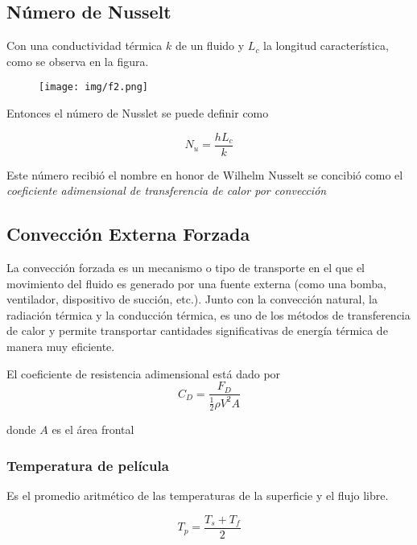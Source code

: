 \subsection{Número de Nusselt}
Con una conductividad térmica $k$ de un fluido
y $L_c$ la longitud característica, como se 
observa en la figura.

\begin{figure}[ht]
    \begin{center}
        \texttt{[image: img/f2.png]}
    \end{center}
     
\end{figure}

Entonces el número de Nusslet se puede definir como

\begin{equation}
    \label{eq:nu:nusselt}
    N_u = \frac{h L_c}{k}
\end{equation}

Este número recibió el nombre en honor de Wilhelm Nusselt
se concibió como el \textit{coeficiente adimensional de
transferencia de calor por convección}




\subsection{Convección Externa Forzada}

La convección forzada es un mecanismo o tipo de transporte en el que el movimiento del fluido es generado por una fuente externa (como una bomba, ventilador, dispositivo de succión, etc.). Junto con la convección natural, la radiación térmica y la conducción térmica, es uno de los métodos de transferencia de calor y permite transportar cantidades significativas de energía térmica de manera muy eficiente.

El coeficiente de resistencia adimensional está dado por
\begin{equation}
    C_D = \frac{F_D}{\frac{1}{2} \rho V^2 A}
\end{equation}

donde $A$ es el área frontal

\subsubsection{Temperatura de película}
Es el promedio aritmético de las temperaturas
de la superficie y el flujo libre.

\begin{equation}
    T_p = \frac{T_s + T_f}{2}
\end{equation}

